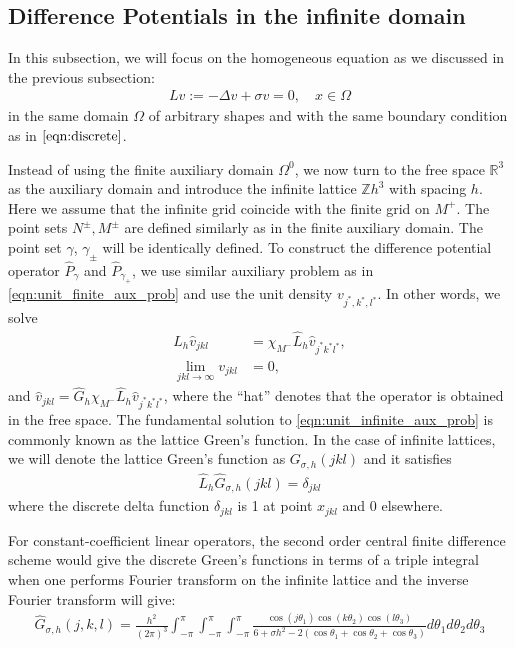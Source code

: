 \subsection{Difference Potentials in the infinite domain}

In this subsection, we will focus on the homogeneous equation as we discussed in the previous subsection:
\begin{align}
Lv:=-\Delta v+\sigma v = 0, \quad x\in \Omega
\end{align}
in the same domain $\Omega$ of arbitrary shapes and with the same boundary condition as in $\eqref{eqn:discrete}$.

Instead of using the finite auxiliary domain $\Omega^0$, we now turn to the free space $\mathbb{R}^3$ as the auxiliary domain and introduce the infinite lattice ${\mathbb{Z}h}^3$ with spacing $h$. Here we assume that the infinite grid coincide with the finite grid on $M^+$. The point sets $N^\pm, M^\pm$ are defined similarly as in the finite auxiliary domain. The point set $\gamma$, $\gamma_\pm$ will be identically defined. To construct the difference potential operator $\widehat{P}_{\gamma}$ and $\widehat{P}_{\gamma_+}$, we use similar auxiliary problem as in \eqref{eqn:unit_finite_aux_prob} and use the unit density $v_{j^*,k^*,l^*}$. In other words, we solve 
\begin{subequations}\label{eqn:unit_infinite_aux_prob}
\begin{align}
\widehat{L}_h \hat{v}_{jkl} &= \chi_{M^-}\widehat{L}_h\hat{v}_{j^*k^*l^*},\\
\lim_{jkl\rightarrow\infty}v_{jkl} &= 0,
\end{align}
\end{subequations} 
and $\hat{v}_{jkl}=\widehat{G}_h\chi_{M^-}\widehat{L}_h\hat{v}_{j^*k^*l^*}$,
where the ``hat'' denotes that the operator is obtained in the free space. The fundamental solution to \eqref{eqn:unit_infinite_aux_prob} is commonly known as the lattice Green's function. In the case of infinite lattices, we will denote the lattice Green's function as $G_{\sigma,h}(jkl)$ and it satisfies
\begin{align}\label{eqn:lgf_delta}
\widehat{L}_h\widehat{G}_{\sigma,h}(jkl) = \delta_{jkl}
\end{align}
where the discrete delta function $\delta_{jkl}$ is 1 at point $x_{jkl}$ and 0 elsewhere. 

For constant-coefficient linear operators, the second order central finite difference scheme would give the discrete Green's functions in terms of a triple integral when one performs Fourier transform on the infinite lattice and the inverse Fourier transform will give:
\begin{align}\label{eqn:lgf}
\widehat{G}_{\sigma,h}(j,k,l) = \frac{h^2}{(2\pi)^3}\int_{-\pi}^{\pi}\int_{-\pi}^{\pi}\int_{-\pi}^{\pi} \frac{\cos(j\theta_1)\cos(k\theta_2)\cos(l\theta_3)}{6+\sigma h^2  - 2(\cos\theta_1+\cos\theta_2+\cos\theta_3)}d\theta_1d\theta_2d\theta_3
\end{align}

